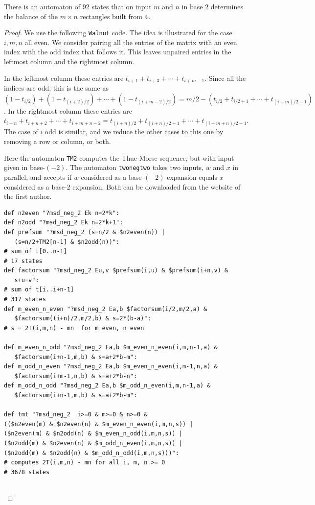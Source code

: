 \documentclass[10pt,a4paper]{amsart}
\begin{document}
\begin{theorem}
    There is an automaton of $92$ states that on input $m$ and $n$ in base $2$ determines the balance of the $m \times n$ rectangles
    built from $\bf t$.
\end{theorem}

\begin{proof}
We use the following {\tt Walnut} code.
The idea is illustrated for the case $i,m,n$ all even.  We consider pairing all the entries of the matrix with an even index with the odd index that follows it.
This leaves unpaired entries in the leftmost column and the
rightmost column.

In the leftmost column these entries are
$t_{i+1} + t_{i+3} + \cdots + t_{i+m-1}$.
Since all the indices are odd,
this is the same as
$(1-t_{i/2}) +  (1-t_{(i+2)/2}) + \cdots + (1-t_{(i+m-2)/2})
= m/2 - (t_{i/2} + t_{i/2+1} + \cdots + t_{(i+m)/2-1})$.
In the rightmost column these entries are
$t_{i+n} + t_{i+n+2} + \cdots + t_{i+m+n-2} =
t_{(i+n)/2} + t_{(i+n)/2 + 1} + \cdots +
t_{(i+m+n)/2 -1}$.
The case of $i$ odd is similar, and we reduce the other cases to this one by removing a row or column, or both.

Here the automaton {\tt TM2} computes the Thue-Morse sequence, but with input given in base-$(-2)$.  The automaton
{\tt twonegtwo} takes two inputs,
$w$ and $x$ in parallel, and accepts if $w$ considered as a base-$(-2)$ expansion equals $x$ considered as a base-$2$ expansion.  Both can be downloaded from the website of the first author.
\begin{verbatim}
def n2even "?msd_neg_2 Ek n=2*k":
def n2odd "?msd_neg_2 Ek n=2*k+1":
def prefsum "?msd_neg_2 (s=n/2 & $n2even(n)) | 
   (s=n/2+TM2[n-1] & $n2odd(n))":
# sum of t[0..n-1]
# 17 states
def factorsum "?msd_neg_2 Eu,v $prefsum(i,u) & $prefsum(i+n,v) & 
   s+u=v":
# sum of t[i..i+n-1]
# 317 states
def m_even_n_even "?msd_neg_2 Ea,b $factorsum(i/2,m/2,a) & 
   $factorsum((i+n)/2,m/2,b) & s=2*(b-a)":
# s = 2T(i,m,n) - mn  for m even, n even

def m_even_n_odd "?msd_neg_2 Ea,b $m_even_n_even(i,m,n-1,a) & 
   $factorsum(i+n-1,m,b) & s=a+2*b-m":
def m_odd_n_even "?msd_neg_2 Ea,b $m_even_n_even(i,m-1,n,a) & 
   $factorsum(i+m-1,n,b) & s=a+2*b-n":
def m_odd_n_odd "?msd_neg_2 Ea,b $m_odd_n_even(i,m,n-1,a) & 
   $factorsum(i+n-1,m,b) & s=a+2*b-m":

def tmt "?msd_neg_2  i>=0 & m>=0 & n>=0 & 
(($n2even(m) & $n2even(n) & $m_even_n_even(i,m,n,s)) |
($n2even(m) & $n2odd(n) & $m_even_n_odd(i,m,n,s)) |
($n2odd(m) & $n2even(n) & $m_odd_n_even(i,m,n,s)) |
($n2odd(m) & $n2odd(n) & $m_odd_n_odd(i,m,n,s)))":
# computes 2T(i,m,n) - mn for all i, m, n >= 0
# 3678 states


\end{verbatim}
\end{proof}
\end{document}
